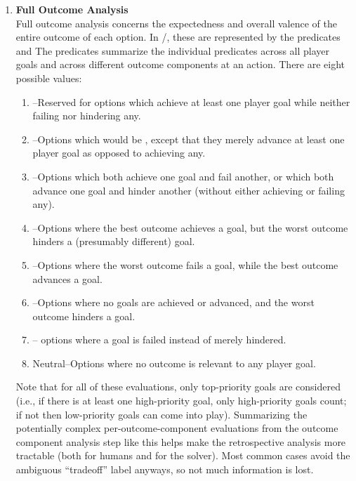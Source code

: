 \begin{enumerate}
  \item %
    \textbf{Full Outcome Analysis} \\
    Full outcome analysis concerns the expectedness and overall valence of the entire outcome of each option.
    In \dunyazad/, these are represented by the predicates   and 
    The  predicates summarize the individual  predicates across all player goals and across different outcome components at an action.
    There are eight possible  values:
    \begin{enumerate}
      \item {}--Reserved for options which achieve at least one player goal while neither failing nor hindering any.
      \item {}--Options which would be , except that they merely advance at least one player goal as opposed to achieving any.
      \item {}--Options which both achieve one goal and fail another, or which both advance one goal and hinder another (without either achieving or failing any).
      \item {}--Options where the best outcome achieves a goal, but the worst outcome hinders a (presumably different) goal.
      \item {}--Options where the worst outcome fails a goal, while the best outcome advances a goal.
      \item {}--Options where no goals are achieved or advanced, and the worst outcome hinders a goal.
      \item {}-- options where a goal is failed instead of merely hindered.
      \item Neutral--Options where no outcome is relevant to any player goal.
    \end{enumerate}
    Note that for all of these evaluations, only top-priority goals are considered (i.e., if there is at least one high-priority goal, only high-priority goals count; if not then low-priority goals can come into play).
    Summarizing the potentially complex per-outcome-component evaluations from the outcome component analysis step like this helps make the retrospective analysis more tractable (both for humans and for the solver).
    Most common cases avoid the ambiguous ``tradeoff'' label anyways, so not much information is lost.


\end{enumerate}
